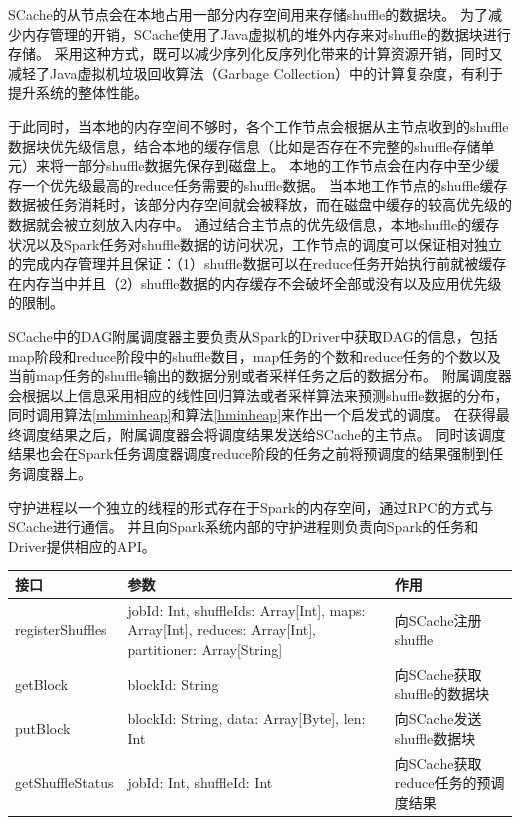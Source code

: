 SCache的从节点会在本地占用一部分内存空间用来存储shuffle的数据块。
为了减少内存管理的开销，SCache使用了Java虚拟机的堆外内存来对shuffle的数据块进行存储。
采用这种方式，既可以减少序列化反序列化带来的计算资源开销，同时又减轻了Java虚拟机垃圾回收算法（Garbage Collection）中的计算复杂度，有利于提升系统的整体性能。

于此同时，当本地的内存空间不够时，各个工作节点会根据从主节点收到的shuffle数据块优先级信息，结合本地的缓存信息（比如是否存在不完整的shuffle存储单元）来将一部分shuffle数据先保存到磁盘上。
本地的工作节点会在内存中至少缓存一个优先级最高的reduce任务需要的shuffle数据。
当本地工作节点的shuffle缓存数据被任务消耗时，该部分内存空间就会被释放，而在磁盘中缓存的较高优先级的数据就会被立刻放入内存中。
通过结合主节点的优先级信息，本地shuffle的缓存状况以及Spark任务对shuffle数据的访问状况，工作节点的调度可以保证相对独立的完成内存管理并且保证：（1）shuffle数据可以在reduce任务开始执行前就被缓存在内存当中并且（2）shuffle数据的内存缓存不会破坏全部或没有以及应用优先级的限制。

SCache中的DAG附属调度器主要负责从Spark的Driver中获取DAG的信息，包括map阶段和reduce阶段中的shuffle数目，map任务的个数和reduce任务的个数以及当前map任务的shuffle输出的数据分别或者采样任务之后的数据分布。
附属调度器会根据以上信息采用相应的线性回归算法或者采样算法来预测shuffle数据的分布，同时调用算法\ref{mhminheap}和算法\ref{hminheap}来作出一个启发式的调度。
在获得最终调度结果之后，附属调度器会将调度结果发送给SCache的主节点。
同时该调度结果也会在Spark任务调度器调度reduce阶段的任务之前将预调度的结果强制到任务调度器上。

守护进程以一个独立的线程的形式存在于Spark的内存空间，通过RPC的方式与SCache进行通信。
并且向Spark系统内部的守护进程则负责向Spark的任务和Driver提供相应的API。

\begin{table}[!hpb]
    \centering
    \begin{tabular}{ | m{2.5cm} | m{8cm} | m{5cm} | }
        \hline
        接口 & 参数 & 作用 \\ [0.5ex]
        \hline
        \hline
        registerShuffles & jobId: Int, shuffleIds: Array[Int], maps: Array[Int], reduces: Array[Int], partitioner: Array[String] & 向SCache注册shuffle \\ \hline
        getBlock & blockId: String & 向SCache获取shuffle的数据块 \\ \hline
        putBlock & blockId: String, data: Array[Byte], len: Int & 向SCache发送shuffle数据块 \\ \hline
        getShuffleStatus & jobId: Int, shuffleId: Int & 向SCache获取reduce任务的预调度结果 \\
        \hline
    \end{tabular}
\end{table}

